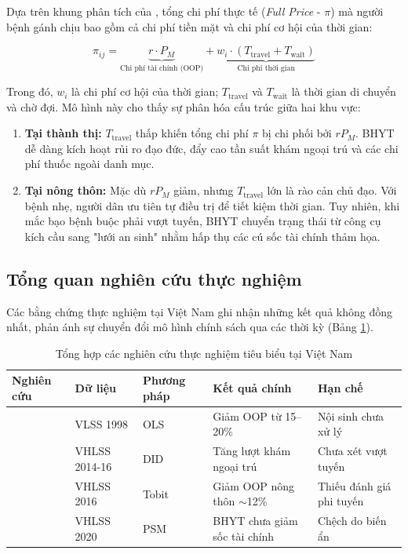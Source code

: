 \documentclass[12pt,a4paper]{article}
\begin{document}
Dựa trên khung phân tích của \textcite{sarkodie2022}, tổng chi phí thực tế (\textit{Full Price} - $\pi$) mà người bệnh gánh chịu bao gồm cả chi phí tiền mặt và chi phí cơ hội của thời gian:

\begin{equation}
	\pi_{ij} = \underbrace{r \cdot P_{M}}_{\text{Chi phí tài chính (OOP)}} + \underbrace{w_i \cdot (T_{\text{travel}} + T_{\text{wait}})}_{\text{Chi phí thời gian}}
\end{equation}

Trong đó, $w_i$ là chi phí cơ hội của thời gian; $T_{\text{travel}}$ và $T_{\text{wait}}$ là thời gian di chuyển và chờ đợi. Mô hình này cho thấy sự phân hóa cấu trúc giữa hai khu vực:
\begin{enumerate}
	\item \textbf{Tại thành thị:} $T_{\text{travel}}$ thấp khiến tổng chi phí $\pi$ bị chi phối bởi $rP_M$. BHYT dễ dàng kích hoạt rủi ro đạo đức, đẩy cao tần suất khám ngoại trú và các chi phí thuốc ngoài danh mục.
	\item \textbf{Tại nông thôn:} Mặc dù $rP_M$ giảm, nhưng $T_{\text{travel}}$ lớn là rào cản chủ đạo. Với bệnh nhẹ, người dân ưu tiên tự điều trị để tiết kiệm thời gian. Tuy nhiên, khi mắc bạo bệnh buộc phải vượt tuyến, BHYT chuyển trạng thái từ công cụ kích cầu sang "lưới an sinh" nhằm hấp thụ các cú sốc tài chính thảm họa.
\end{enumerate}

\subsection{Tổng quan nghiên cứu thực nghiệm}

Các bằng chứng thực nghiệm tại Việt Nam ghi nhận những kết quả không đồng nhất, phản ánh sự chuyển đổi mô hình chính sách qua các thời kỳ (Bảng \ref{tab:litreview}).

\begin{table}[htbp]
	\centering
	\small
	\caption{Tổng hợp các nghiên cứu thực nghiệm tiêu biểu tại Việt Nam}
	\label{tab:litreview}
	\begin{tabular}{p{2.5cm}p{2.2cm}p{2.2cm}p{4cm}p{3cm}}
		\toprule
		\textbf{Nghiên cứu} & \textbf{Dữ liệu} & \textbf{Phương pháp} & \textbf{Kết quả chính} & \textbf{Hạn chế} \\
		\midrule
		\textcite{jowett2003} & VLSS 1998 & OLS & Giảm OOP từ 15--20\% & Nội sinh chưa xử lý \\
		\textcite{thuong2020did} & VHLSS 2014-16 & DID & Tăng lượt khám ngoại trú & Chưa xét vượt tuyến \\
		\textcite{lee2019ijerph} & VHLSS 2016 & Tobit & Giảm OOP nông thôn $\sim$12\% & Thiếu đánh giá phi tuyến \\
		\textcite{giang2022} & VHLSS 2020 & PSM & BHYT chưa giảm sốc tài chính & Chệch do biến ẩn \\
		\bottomrule
	\end{tabular}
\end{table}
\end{document}
